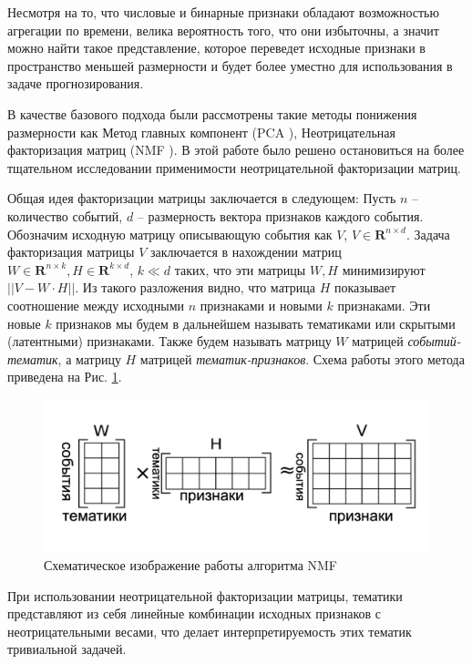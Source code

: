 Несмотря на то, что числовые и бинарные признаки обладают возможностью агрегации по времени, велика вероятность того, что они избыточны, а значит можно найти такое представление, которое переведет исходные признаки в пространство меньшей размерности и будет более уместно для использования в задаче прогнозирования. 

В качестве базового подхода были рассмотрены такие методы понижения размерности как Метод главных компонент (PCA \cite{pca_orig}), Неотрицательная факторизация матриц (NMF \cite{nmf_orig}). В этой работе было решено остановиться на более тщательном исследовании применимости неотрицательной факторизации матриц. 

Общая идея факторизации матрицы заключается в следующем: 
Пусть $n$ -- количество событий, $d$ -- размерность вектора признаков каждого события. Обозначим исходную матрицу описывающую события как $V$, $V \in \mathbf{R}^{n \times d}$. Задача факторизация матрицы $V$ заключается в нахождении матриц $W \in \mathbf{R}^{n \times k}, H \in \mathbf{R}^{k \times d}$, $k \ll d$ таких, что эти матрицы $W, H$ минимизируют $||V - W \cdot H||$. Из такого разложения видно, что матрица $H$ показывает соотношение между исходными $n$ признаками и новыми $k$ признаками. Эти новые $k$ признаков мы будем в дальнейшем называть тематиками или скрытыми (латентными) признаками. Также будем называть матрицу $W$ матрицей \textit{событий-тематик}, а матрицу $H$ матрицей \textit{тематик-признаков}. Схема работы этого метода приведена на Рис. \ref{fig:nmf_scheme}.

\begin{figure}
\centering
  \includegraphics[width=.9\linewidth]{images/nmf_scheme.png}
  \caption{Схематическое изображение работы алгоритма NMF}
  \label{fig:nmf_scheme}
\end{figure}

При использовании неотрицательной факторизации матрицы, тематики представляют из себя линейные комбинации исходных признаков с неотрицательными весами, что делает интерпретируемость этих тематик тривиальной задачей.

